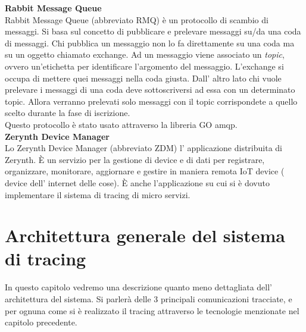 \documentclass[a4paper,12pt,titlepage,italian,openany]{report}
\begin{document}
\textbf{Rabbit Message Queue}\\
Rabbit Message Queue\cite{rabbit:1} (abbreviato RMQ) è un protocollo di scambio di messaggi. Si basa sul concetto di pubblicare e prelevare messaggi su/da una coda di messaggi. Chi pubblica un messaggio non lo fa direttamente su una coda ma su un oggetto chiamato exchange. Ad un messaggio viene associato un \textit{topic}, ovvero un'etichetta per identificare l'argomento del messaggio. L'exchange si occupa di mettere quei messaggi nella coda giusta. Dall' altro lato chi 
vuole prelevare i messaggi di una coda deve sottoscriversi ad essa con un determinato topic. Allora verranno prelevati solo messaggi con il topic corrispondete a quello scelto durante la fase di iscrizione.\\
Questo protocollo è stato usato attraverso la libreria GO amqp.\\[12pt]
\textbf{Zerynth Device Manager}\\
Lo Zerynth Device Manager\cite{zdm:1} (abbreviato ZDM) l' applicazione distribuita di Zerynth. È un servizio per la gestione di device e di dati per registrare, organizzare, monitorare, aggiornare e gestire in maniera remota IoT device ( device dell' internet delle cose).
È anche l'applicazione su cui si è dovuto implementare il sistema di tracing di micro servizi.

\chapter{Architettura generale del sistema di tracing}
In questo capitolo vedremo una descrizione quanto meno dettagliata dell' architettura del sistema. Si parlerà delle 3 principali comunicazioni tracciate, e per ognuna come si è realizzato il tracing attraverso le
tecnologie menzionate nel capitolo precedente.
\end{document}
